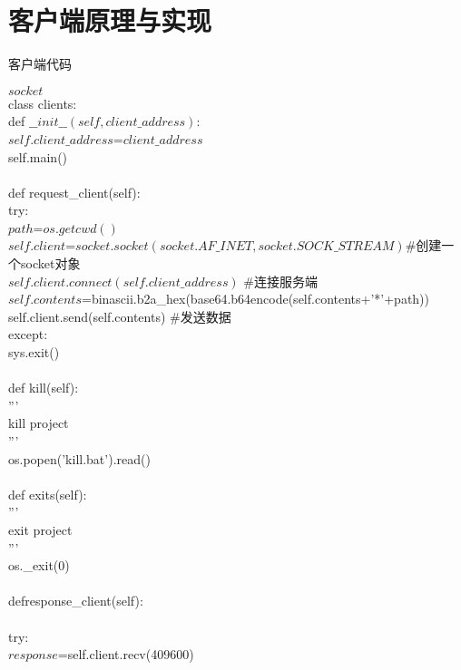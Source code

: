 \section{客户端原理与实现}
\begin{breakablealgorithm}
	\caption{客户端代码}
	\begin{algorithmic}[1]
	\Require $socket$\\
class clients:\\
\quad def \quad $\_\_init\_\_(self,client\_address)$:\\
		\qquad $self.client\_address$=$client\_address$\\
		\qquad self.main()\\
\\
\quad def \quad request\_client(self):\\
\qquad try:\\
\qquad \quad $path$=$os.getcwd()$\\
\qquad \quad $self.client$=$socket.socket(socket.AF\_INET,socket.SOCK\_STREAM)$\qquad \#创建一个socket对象\\
\qquad \quad $self.client.connect(self.client\_address)$ \qquad \#连接服务端\\
\qquad \quad $self.contents$=binascii.b2a\_hex(base64.b64encode(self.contents+'*'+path))\\
\qquad \quad self.client.send(self.contents) \qquad \#发送数据\\
\qquad except:\\
\qquad \quad sys.exit()\\
\\
\quad def \quad kill(self):\\
\qquad '''\\
\qquad kill project\\
\qquad '''\\
\qquad \quad os.popen('kill.bat').read()\\
\\
\quad def \quad exits(self):\\
\qquad '''\\
\qquad exit project\\
\qquad '''\\
\qquad os.\_exit(0)\\
\\
\quad def\quad response\_client(self):\\
\\
\qquad try:\\
\qquad \quad  $response$=self.client.recv(409600)\\

\end{algorithmic}
\end{breakablealgorithm}
